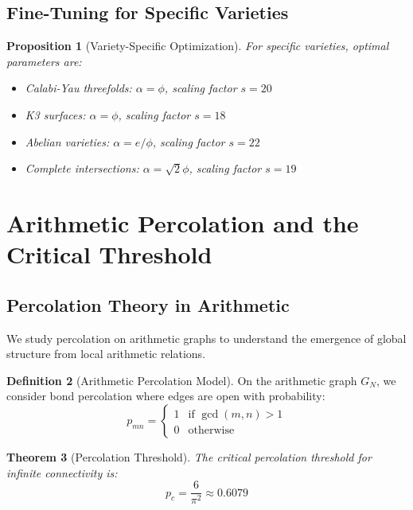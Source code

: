 \documentclass[11pt,a4paper]{article}
\theoremstyle{plain}
\newtheorem{theorem}{Theorem}[section]
\newtheorem{proposition}[theorem]{Proposition}
\theoremstyle{definition}
\newtheorem{definition}[theorem]{Definition}
\theoremstyle{remark}
\newcommand{\goldenratio}{\phi}
\begin{document}
\subsection{Fine-Tuning for Specific Varieties}

\begin{proposition}[Variety-Specific Optimization]
For specific varieties, optimal parameters are:
\begin{itemize}
\item Calabi-Yau threefolds: $\alpha = \goldenratio$, scaling factor $s = 20$
\item K3 surfaces: $\alpha = \goldenratio$, scaling factor $s = 18$
\item Abelian varieties: $\alpha = e/\goldenratio$, scaling factor $s = 22$
\item Complete intersections: $\alpha = \sqrt{2}\goldenratio$, scaling factor $s = 19$
\end{itemize}
\end{proposition}

\section{Arithmetic Percolation and the Critical Threshold}

\subsection{Percolation Theory in Arithmetic}

We study percolation on arithmetic graphs to understand the emergence of global structure from local arithmetic relations.

\begin{definition}[Arithmetic Percolation Model]
On the arithmetic graph $G_N$, we consider bond percolation where edges are open with probability:
\begin{equation}
p_{mn} = \begin{cases}
1 & \text{if } \gcd(m,n) > 1 \\
0 & \text{otherwise}
\end{cases}
\end{equation}
\end{definition}

\begin{theorem}[Percolation Threshold]
The critical percolation threshold for infinite connectivity is:
\begin{equation}
p_c = \frac{6}{\pi^2} \approx 0.6079
\end{equation}
\end{theorem}
\end{document}

